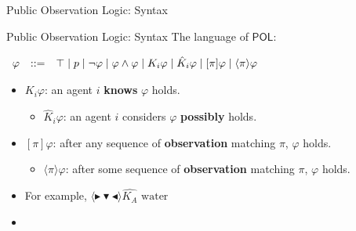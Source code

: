 \documentclass[usenames,dvipsnames]{beamer}
\newcommand\ldiaarg[1]{\langle#1\rangle}
\newcommand{\POL}{\mathsf{POL}}
\newcommand{\ep}{\ensuremath{\varepsilon}}
\newcommand{\obsright}{\blacktriangleright}
\newcommand{\obsleft}{\blacktriangleleft}
\newcommand{\obsdown}{\blacktriangledown}
\renewcommand{\phi}{\varphi}
\begin{document}
\begin{frame}{Public Observation Logic: Syntax\footnotemark[1]}
\begin{itemize}
\begin{figure}
    \end{figure}
    \end{itemize}
\end{frame}


\begin{frame}{Public Observation Logic: Syntax\footnotemark[1]}
The language of $\POL$:
\vspace{.1cm}
			
		     $\begin{array}{r@{\quad::= \quad}l}
				\phi  &
				\top
				\mid
				p
				\mid \neg \phi
				\mid \phi \land \phi
				\mid K_i\phi
				\mid \hat{K}_i \phi
				\mid [\pi] \phi
				\mid \ldiaarg{\pi} \phi
			\end{array}$
			
			\vspace{.1cm}
    \begin{itemize}
        \item $K_i\varphi$: an agent $i$ \textbf{knows} $\varphi$ holds.
        \vspace{.1cm}
        \begin{itemize}
            \item $\hat{K}_i\phi$: an agent $i$ considers $\varphi$ \textbf{possibly} holds.
        \end{itemize}
        \vspace{.1cm}
        \item $[\pi]\varphi$: after any sequence of \textbf{observation} matching $\pi$, $\varphi$ holds.
        \vspace{.1cm}
        \begin{itemize}
            \item $\ldiaarg{\pi}\phi$: after some sequence of \textbf{observation} matching $\pi$, $\varphi$ holds.
        \end{itemize}
        \vspace{.1cm}
        \item For example, $\ldiaarg{\obsright\obsdown\obsleft}\hat{K_A} \textrm{ water }$
    
    \item[]
    

\end{itemize}
\end{frame}
\end{document}
